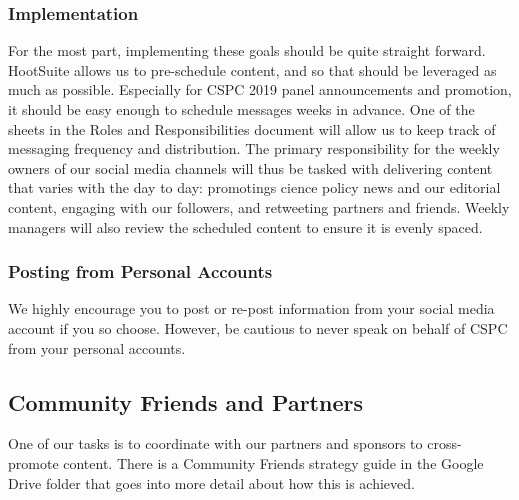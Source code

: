 \documentclass[11pt]{amsart}
\begin{document}
\subsubsection{Implementation}
For the most part, implementing these goals should be quite straight forward.
HootSuite allows us to pre-schedule content, and so that should be leveraged as much as possible.
Especially for CSPC 2019 panel announcements and promotion, it should be easy enough to schedule messages weeks in advance.
One of the sheets in the Roles and Responsibilities document will allow us to keep track of messaging frequency and distribution.
The primary responsibility for the weekly owners of our social media channels will thus be tasked with delivering content that varies with the day to day: promotings cience policy news and our editorial content, engaging with our followers, and retweeting partners and friends.
Weekly managers will also review the scheduled content to ensure it is evenly spaced.
\subsubsection{Posting from Personal Accounts}
We highly encourage you to post or re-post information from your social media account if you so choose.
However, be cautious to never speak on behalf of CSPC from your personal accounts.
\subsection{Community Friends and Partners}
One of our tasks is to coordinate with our partners and sponsors to cross-promote content.
There is a Community Friends strategy guide in the Google Drive folder that goes into more detail about how this is achieved.
\end{document}
